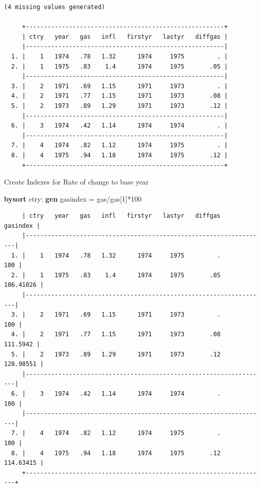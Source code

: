 \documentclass[
]{book}
\newenvironment{Shaded}{\begin{snugshade}}{\end{snugshade}}
\newcommand{\KeywordTok}[1]{\textcolor[rgb]{0.13,0.29,0.53}{\textbf{#1}}}
\newcommand{\NormalTok}[1]{#1}
\begin{document}
\begin{verbatim}
(4 missing values generated)

     +-------------------------------------------------------+
     | ctry   year   gas   infl   firstyr   lastyr   diffgas |
     |-------------------------------------------------------|
  1. |    1   1974   .78   1.32      1974     1975         . |
  2. |    1   1975   .83    1.4      1974     1975       .05 |
     |-------------------------------------------------------|
  3. |    2   1971   .69   1.15      1971     1973         . |
  4. |    2   1971   .77   1.15      1971     1973       .08 |
  5. |    2   1973   .89   1.29      1971     1973       .12 |
     |-------------------------------------------------------|
  6. |    3   1974   .42   1.14      1974     1974         . |
     |-------------------------------------------------------|
  7. |    4   1974   .82   1.12      1974     1975         . |
  8. |    4   1975   .94   1.18      1974     1975       .12 |
     +-------------------------------------------------------+
\end{verbatim}

Create Indexes for Rate of change to base year

\begin{Shaded}
\begin{Highlighting}[]
\KeywordTok{bysort}\NormalTok{ ctry: }\KeywordTok{gen}\NormalTok{ gasindex = gas/gas[1]*100}
\end{Highlighting}
\end{Shaded}

\begin{verbatim}
     | ctry   year   gas   infl   firstyr   lastyr   diffgas    gasindex |
     |-------------------------------------------------------------------|
  1. |    1   1974   .78   1.32      1974     1975         .         100 |
  2. |    1   1975   .83    1.4      1974     1975       .05   106.41026 |
     |-------------------------------------------------------------------|
  3. |    2   1971   .69   1.15      1971     1973         .         100 |
  4. |    2   1971   .77   1.15      1971     1973       .08    111.5942 |
  5. |    2   1973   .89   1.29      1971     1973       .12   128.98551 |
     |-------------------------------------------------------------------|
  6. |    3   1974   .42   1.14      1974     1974         .         100 |
     |-------------------------------------------------------------------|
  7. |    4   1974   .82   1.12      1974     1975         .         100 |
  8. |    4   1975   .94   1.18      1974     1975       .12   114.63415 |
     +-------------------------------------------------------------------+
\end{verbatim}
\end{document}
